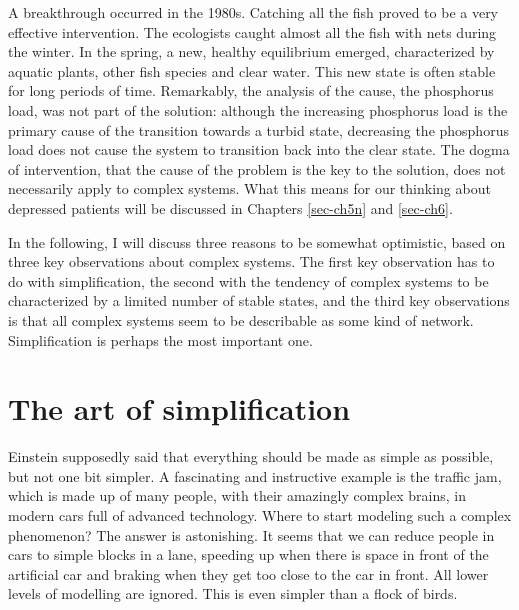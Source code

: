 \documentclass[
  a4paper,
  DIV=11,
  numbers=noendperiod]{scrreprt}
\begin{document}
A breakthrough occurred in the 1980s. Catching all the fish proved to be
a very effective intervention. The ecologists caught almost all the fish
with nets during the winter. In the spring, a new, healthy equilibrium
emerged, characterized by aquatic plants, other fish species and clear
water. This new state is often stable for long periods of time.
Remarkably, the analysis of the cause, the phosphorus load, was not part
of the solution: although the increasing phosphorus load is the primary
cause of the transition towards a turbid state, decreasing the
phosphorus load does not cause the system to transition back into the
clear state. The dogma of intervention, that the cause of the problem is
the key to the solution, does not necessarily apply to complex systems.
What this means for our thinking about depressed patients will be
discussed in Chapters \ref{sec-ch5n} and \ref{sec-ch6}.

In the following, I will discuss three reasons to be somewhat
optimistic, based on three key observations about complex systems. The
first key observation has to do with simplification, the second with the
tendency of complex systems to be characterized by a limited number of
stable states, and the third key observations is that all complex
systems seem to be describable as some kind of network. Simplification
is perhaps the most important one.

\hypertarget{sec-The-art-of-simplification}{%
\section{The art of
simplification}\label{sec-The-art-of-simplification}}

Einstein supposedly said that everything should be made as simple as
possible, but not one bit simpler. A fascinating and instructive example
is the traffic jam, which is made up of many people, with their
amazingly complex brains, in modern cars full of advanced technology.
Where to start modeling such a complex phenomenon? The answer is
astonishing. It seems that we can reduce people in cars to simple blocks
in a lane, speeding up when there is space in front of the artificial
car and braking when they get too close to the car in front. All lower
levels of modelling are ignored. This is even simpler than a flock of
birds.
\end{document}
